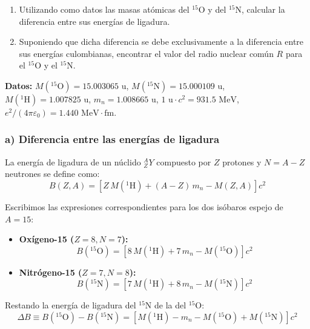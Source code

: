 \begin{problema}
    \begin{enumerate}[label=\alph*)]
        \item Utilizando como datos las masas atómicas del ${}^{15}\text{O}$ y del ${}^{15}\text{N}$, calcular la diferencia entre sus energías de ligadura.
        \item Suponiendo que dicha diferencia se debe exclusivamente a la diferencia entre sus energías culombianas, encontrar el valor del radio nuclear común $R$ para el ${}^{15}\text{O}$ y el ${}^{15}\text{N}$.
    \end{enumerate}
\textbf{Datos:} $M({}^{15}\text{O}) = 15.003065\text{ u}$, $M({}^{15}\text{N}) = 15.000109\text{ u}$, $M({}^1\text{H}) = 1.007825\text{ u}$, $m_n = 1.008665\text{ u}$, $1\text{ u} \cdot c^2 = 931.5\text{ MeV}$, $e^2/(4\pi\varepsilon_0) = 1.440\text{ MeV}\cdot\text{fm}$.

\tcblower

\subsubsection*{a) Diferencia entre las energías de ligadura}

La energía de ligadura de un núclido ${}_Z^A Y$ compuesto por $Z$ protones y $N = A - Z$ neutrones se define como:
\begin{equation}
B(Z,A) = \left[ Z \, M({}^1\text{H}) + (A - Z) \, m_n - M(Z,A) \right] c^2
\end{equation}

Escribimos las expresiones correspondientes para los dos isóbaros espejo de $A = 15$:
\begin{itemize}
    \item \textbf{Oxígeno-15 ($Z = 8, N = 7$):}
    \begin{equation}
    B({}^{15}\text{O}) = \left[ 8 \, M({}^1\text{H}) + 7 \, m_n - M({}^{15}\text{O}) \right] c^2
    \end{equation}
    \item \textbf{Nitrógeno-15 ($Z = 7, N = 8$):}
    \begin{equation}
    B({}^{15}\text{N}) = \left[ 7 \, M({}^1\text{H}) + 8 \, m_n - M({}^{15}\text{N}) \right] c^2
    \end{equation}
\end{itemize}

Restando la energía de ligadura del ${}^{15}\text{N}$ de la del ${}^{15}\text{O}$:
\begin{equation}
\Delta B \equiv B({}^{15}\text{O}) - B({}^{15}\text{N}) = \left[ M({}^1\text{H}) - m_n - M({}^{15}\text{O}) + M({}^{15}\text{N}) \right] c^2
\end{equation}


\end{problema}
